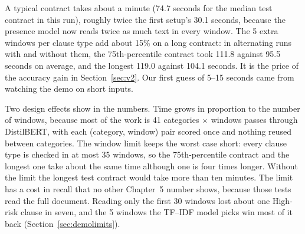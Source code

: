 A typical contract takes about a minute (74.7 seconds for the median test contract in this run), roughly twice the first setup's 30.1 seconds, because the presence model now reads twice as much text in every window. The 5 extra windows per clause type add about 15\% on a long contract: in alternating runs with and without them, the 75th-percentile contract took 111.8 against 95.5 seconds on average, and the longest 119.0 against 104.1 seconds. It is the price of the accuracy gain in Section~\ref{sec:v2}. Our first guess of 5--15 seconds came from watching the demo on short inputs.

Two design effects show in the numbers. Time grows in proportion to the number of windows, because most of the work is 41 categories $\times$ windows passes through DistilBERT, with each (category, window) pair scored once and nothing reused between categories. The window limit keeps the worst case short: every clause type is checked in at most 35 windows, so the 75th-percentile contract and the longest one take about the same time although one is four times longer. Without the limit the longest test contract would take more than ten minutes. The limit has a cost in recall that no other Chapter~5 number shows, because those tests read the full document. Reading only the first 30 windows lost about one High-risk clause in seven, and the 5 windows the TF--IDF model picks win most of it back (Section~\ref{sec:demolimits}).

